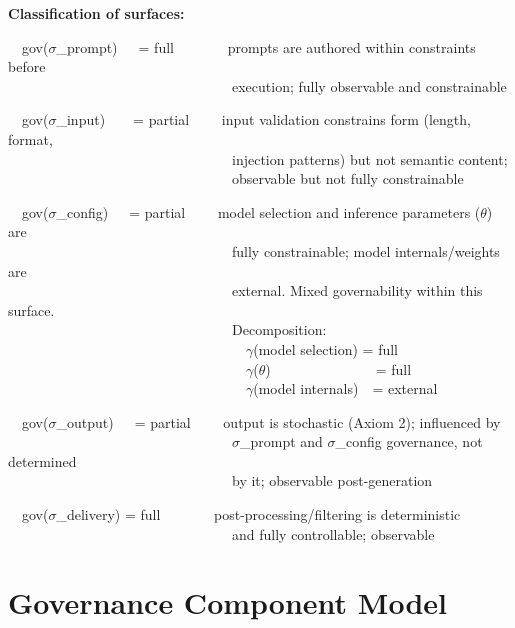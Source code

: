 \textbf{Classification of surfaces:}

\begin{cladnote}
~~gov($\sigma$\_prompt)~~~= full~~~~~~~\textemdash{} prompts are authored within constraints before\\
~~~~~~~~~~~~~~~~~~~~~~~~~~~~~~~~execution; fully observable and constrainable
\par\smallskip
~~gov($\sigma$\_input)~~~~= partial~~~~\textemdash{} input validation constrains form (length, format,\\
~~~~~~~~~~~~~~~~~~~~~~~~~~~~~~~~injection patterns) but not semantic content;\\
~~~~~~~~~~~~~~~~~~~~~~~~~~~~~~~~observable but not fully constrainable
\par\smallskip
~~gov($\sigma$\_config)~~~= partial~~~~\textemdash{} model selection and inference parameters ($\theta$) are\\
~~~~~~~~~~~~~~~~~~~~~~~~~~~~~~~~fully constrainable; model internals/weights are\\
~~~~~~~~~~~~~~~~~~~~~~~~~~~~~~~~external. Mixed governability within this surface.\\
~~~~~~~~~~~~~~~~~~~~~~~~~~~~~~~~Decomposition:\\
~~~~~~~~~~~~~~~~~~~~~~~~~~~~~~~~~~$\gamma$(model selection) = full\\
~~~~~~~~~~~~~~~~~~~~~~~~~~~~~~~~~~$\gamma$($\theta$)~~~~~~~~~~~~~~~= full\\
~~~~~~~~~~~~~~~~~~~~~~~~~~~~~~~~~~$\gamma$(model internals)~~= external
\par\smallskip
~~gov($\sigma$\_output)~~~= partial~~~~\textemdash{} output is stochastic (Axiom 2); influenced by\\
~~~~~~~~~~~~~~~~~~~~~~~~~~~~~~~~$\sigma$\_prompt and $\sigma$\_config governance, not determined\\
~~~~~~~~~~~~~~~~~~~~~~~~~~~~~~~~by it; observable post-generation
\par\smallskip
~~gov($\sigma$\_delivery) = full~~~~~~~\textemdash{} post-processing/filtering is deterministic\\
~~~~~~~~~~~~~~~~~~~~~~~~~~~~~~~~and fully controllable; observable
\end{cladnote}


\section{Governance Component Model}
\label{sec:framework-5}


